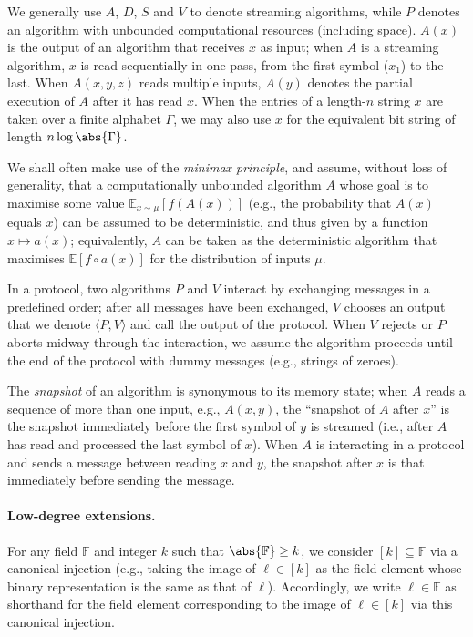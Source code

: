 \documentclass[10pt,a4paper]{article}
\newif\iflipics\lipicsfalse
\theoremstyle{definition}
\newcommand{\E}{\mathbb E}
\newcommand{\field}{\mathbb{F}}
\newcommand{\alphabet}{\Gamma}
\begin{document}
    We generally use $A$, $D$, $S$ and $V$ to denote streaming algorithms, while $P$ denotes an algorithm with unbounded computational resources (including space). $A(x)$ is the output of an algorithm that receives $x$ as input; when $A$ is a streaming algorithm, $x$ is read sequentially in one pass, from the first symbol ($x_1$) to the last. When $A(x, y, z)$ reads multiple inputs, $A(y)$ denotes the partial execution of $A$ after it has read $x$. When the entries of a length-$n$ string $x$ are taken over a finite alphabet $\alphabet$, we may also use $x$ for the equivalent bit string of length $n \log\abs{\alphabet}$.
    
    We shall often make use of the \emph{minimax principle}, and assume, without loss of generality, that a computationally unbounded algorithm $A$ whose goal is to maximise some value $\E_{x \sim \mu}[f(A(x))]$ (e.g., the probability that $A(x)$ equals $x$) can be assumed to be deterministic, and thus given by a function $x \mapsto a(x)$; equivalently, $A$ can be taken as the deterministic algorithm that maximises $\E[f \circ a(x)]$ for the distribution of inputs $\mu$.
    
    In a protocol, two algorithms $P$ and $V$ interact by exchanging messages in a predefined order; after all messages have been exchanged, $V$ chooses an output that we denote $\langle P, V\rangle$ and call the output of the protocol. When $V$ rejects or $P$ aborts midway through the interaction, we assume the algorithm proceeds until the end of the protocol with dummy messages (e.g., strings of zeroes).
    
    The \emph{snapshot} of an algorithm is synonymous to its memory state; when $A$ reads a sequence of more than one input, e.g., $A(x,y)$, the ``snapshot of $A$ after $x$'' is the snapshot immediately before the first symbol of $y$ is streamed (i.e., after $A$ has read and processed the last symbol of $x$). When $A$ is interacting in a protocol and sends a message between reading $x$ and $y$, the snapshot after $x$ is that immediately before sending the message.

    \paragraph*{Low-degree extensions\iflipics\else.\fi} For any field $\field$ and integer $k$ such that $\abs{\field} \geq k$, we consider $[k] \subseteq \field$ via a canonical injection (e.g., taking the image of $\ell \in [k]$ as the field element whose binary representation is the same as that of $\ell$). Accordingly, we write $\ell \in \field$ as shorthand for the field element corresponding to the image of $\ell \in [k]$ via this canonical injection.
    
\end{document}
